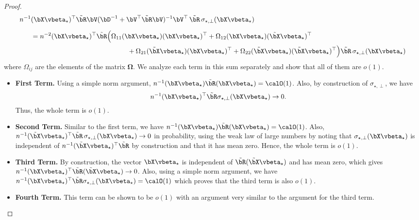 \begin{proof}
    \begin{align*}
       n^{-1} &(\bX\vbeta_\star)^\top\tilde\bR \bV (\bD^{-1} + \bV^\top \tilde\bR\bV)^{-1}  \bV^\top\,\tilde\bR\,\sigma_{\star, \perp}(\bX\vbeta_{\star}) \\[0.2cm]
       &= n^{-2} (\bX\vbeta_\star)^\top\tilde\bR \Big(\Omega_{11}(\bX\vbeta_\star)(\bX\vbeta_\star)^\top + \Omega_{12}(\bX\vbeta_\star)(\tilde\bX\vbeta_\star)^\top\\ &\hspace{5cm}+ \Omega_{21}(\tilde\bX\vbeta_\star)(\bX\vbeta_\star)^\top + \Omega_{22}(\tilde\bX\vbeta_\star)(\tilde\bX\vbeta_\star)^\top\Big)\tilde\bR\,\sigma_{\star, \perp}(\bX\vbeta_{\star})
    \end{align*}
    where $\Omega_{ij}$ are the elements of the matrix $\mathbf{\Omega}$. We  analyze each term in this sum separately and show that all of them are $o(1)$.
    \begin{itemize}
        \item \textbf{First Term.} Using a simple norm argument, $n^{-1} (\bX\vbeta_\star) \tilde\bR(\bX\vbeta_\star) = \calO(1)$. Also, by construction of $\sigma_{\star, \perp}$, we have
        \begin{align*}
            n^{-1}(\bX\vbeta_\star)^\top \tilde\bR\sigma_{\star, \perp}(\bX\vbeta_\star) \to 0.
        \end{align*}
        Thus, the whole term is $o(1)$.
        \item\textbf{Second Term.} Similar to the first term, we have $n^{-1} (\bX\vbeta_\star) \tilde\bR(\bX\vbeta_\star) = \calO(1)$. Also, $n^{-1}(\tilde\bX\vbeta_\star)^\top \tilde\bR\,\sigma_{\star, \perp}(\bX\vbeta_\star) \to 0$ in probability, using the weak law of large numbers by noting that $\sigma_{\star, \perp}(\bX\vbeta_\star)$ is independent of $n^{-1}(\tilde\bX\vbeta_\star)^\top \tilde\bR$ by construction and that it has mean zero. Hence, the whole term is $o(1)$.
        \item\textbf{Third Term.} By construction, the vector $\bX\vbeta_\star$ is independent of $\tilde\bR (\tilde\bX\vbeta_\star)$ and has mean zero, which gives $n^{-1}(\bX\vbeta_\star)^\top\tilde\bR(\tilde\bX\vbeta_\star) \to 0$. Also, using a simple norm argument, we have $n^{-1}(\bX\vbeta_\star)^\top \tilde\bR\sigma_{\star, \perp}(\bX\vbeta_\star) = \calO(1)$ which proves that the third term is also $o(1)$.
        \item \textbf{Fourth Term.} This term can be shown to be $o(1)$ with an argument very similar to the argument for the third term.
    \end{itemize}
    

\end{proof}
